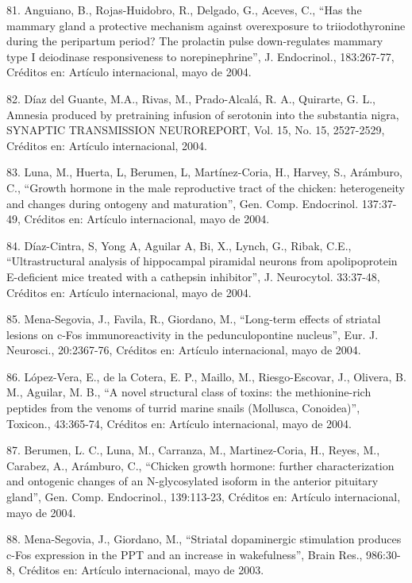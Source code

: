 81. Anguiano, B., Rojas-Huidobro, R., Delgado, G., Aceves, C., “Has the mammary gland a protective mechanism against 
overexposure to triiodothyronine during the peripartum period? The prolactin pulse down-regulates mammary type I deiodinase 
responsiveness to norepinephrine”, J. Endocrinol., 183:267-77, Créditos en: Artículo internacional, mayo de 2004.

82. Díaz del Guante, M.A., Rivas, M., Prado-Alcalá, R. A., Quirarte, G. L., Amnesia produced by pretraining infusion of 
serotonin into the substantia nigra, SYNAPTIC TRANSMISSION NEUROREPORT, Vol. 15, No. 15, 2527-2529, Créditos en: Artículo 
internacional, 2004.

83. Luna, M., Huerta, L, Berumen, L, Martínez-Coria, H., Harvey, S., Arámburo, C., “Growth hormone in the male reproductive 
tract of the chicken: heterogeneity and changes during ontogeny and maturation”, Gen. Comp. Endocrinol. 137:37-49, Créditos en: 
Artículo internacional, mayo de 2004.

84. Díaz-Cintra, S, Yong A, Aguilar A, Bi, X., Lynch, G., Ribak, C.E., “Ultrastructural analysis of hippocampal piramidal 
neurons from apolipoprotein E-deficient mice treated with a cathepsin inhibitor”, J. Neurocytol. 33:37-48, Créditos en: 
Artículo internacional, mayo de 2004.

85. Mena-Segovia, J., Favila, R., Giordano, M., “Long-term effects of striatal lesions on c-Fos immunoreactivity in the 
pedunculopontine nucleus”, Eur. J. Neurosci., 20:2367-76, Créditos en: Artículo internacional, mayo de 2004.

86. López-Vera, E., de la Cotera, E. P., Maillo, M., Riesgo-Escovar, J., Olivera, B. M., Aguilar, M. B., “A novel structural 
class of toxins: the methionine-rich peptides from the venoms of turrid marine snails (Mollusca, Conoidea)”, Toxicon., 
43:365-74, Créditos en: Artículo internacional, mayo de 2004.

87. Berumen, L. C., Luna, M., Carranza, M., Martinez-Coria, H., Reyes, M., Carabez, A., Arámburo, C., “Chicken growth hormone: 
further characterization and ontogenic changes of an N-glycosylated isoform in the anterior pituitary gland”, Gen. Comp. 
Endocrinol., 139:113-23, Créditos en: Artículo internacional, mayo de 2004.

88. Mena-Segovia, J., Giordano, M., “Striatal dopaminergic stimulation produces c-Fos expression in the PPT and an increase in 
wakefulness”, Brain Res., 986:30-8, Créditos en: Artículo internacional, mayo de 2003.

